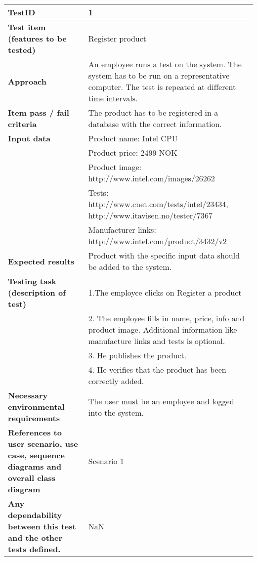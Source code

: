 

\begin{table}
    \centering
	\begin{tabularx}{1.2\textwidth}{| p{5cm} | X |}
	\hline
	\textbf{TestID} 																& 1\\ \hline
	\textbf{Test item (features to be tested)} 											& Register product\\ \hline
	\textbf{Approach} 															& An employee runs a test on the system. The system has to be run on a representative computer. 
																			The test is repeated at different time intervals.\\ \hline
	\textbf{Item pass / fail criteria} 													& The product has to be registered in a database with the correct information.\\ \hline
	\textbf{Input data} 															& Product name: Intel CPU\\ 
																			& Product price: 2499 NOK\\ 
																			& Product image: http://www.intel.com/images/26262\\ 
																			& Tests: {http://www.cnet.com/tests/intel/23434, http://www.itavisen.no/tester/7367} \\ 
																			& Manufacturer links: {http://www.intel.com/product/3432/v2}\\ \hline
	\textbf{Expected results}									 					& Product with the specific input data should be added to the system.\\ \hline
	\textbf{Testing task (description of test)} 											& 1.The employee clicks on Register a product \\
																			& 2. The employee fills in name, price, info and product image.  Additional information like manufacture links and tests is optional.\\
																			& 3. He publishes the product.\\
																			& 4. He verifies that the product has been correctly added.\\ \hline
	\textbf{Necessary environmental requirements} 										& The user must be an employee and logged into the system.\\ \hline
	\textbf{References to user scenario, use case, sequence diagrams and overall class diagram} 		& Scenario 1\\ \hline
	\textbf{Any dependability between this test and the other tests defined.}		 				& NaN\\ \hline
	\end{tabularx}
\end{table}

